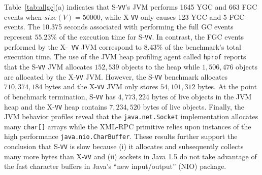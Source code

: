 \documentclass{sig-alternate}
\begin{document}
Table~\ref{tab:allgc}(a) indicates that S-{\tt VV}'s JVM performs 1645
YGC and 663 FGC events when $size(V)=50000$, while X-{\tt VV} only
causes 123 YGC and 5 FGC events.  The 10.375 seconds associated with
performing the full GC events represent $55.23\%$ of the execution time
for S-{\tt VV}.  In contrast, the FGC events performed by the X-{\tt
  VV} JVM correspond to $8.43\%$ of the benchmark's total execution
time.  The use of the JVM heap profiling agent called {\tt hprof}
reports that the S-{\tt VV} JVM allocates $152,539$ objects to the
heap while $1,506,476$ objects are allocated by the X-{\tt VV} JVM.
However, the S-{\tt VV} benchmark allocates $710,374,184$ bytes and
the X-{\tt VV} JVM only stores $54,101,312$ bytes.  At the point of
benchmark termination, S-{\tt VV} has $4,773,224$ bytes of live
objects in the JVM heap and the X-{\tt VV} heap contains $7,234,520$
bytes of live objects.  Finally, the JVM behavior profiles reveal that
the {\tt java.net.Socket} implementation allocates many {\tt char[]}
arrays while the XML-RPC primitive relies upon instances of the high
performance {\tt java.nio.CharBuffer}.  These results further support
the conclusion that S-{\tt VV} is slow because (i) it allocates and
subsequently collects many more bytes than X-{\tt VV} and (ii) sockets
in Java 1.5 do not take advantage of the fast character buffers in
Java's ``new input/output'' (NIO) package.
\end{document}
